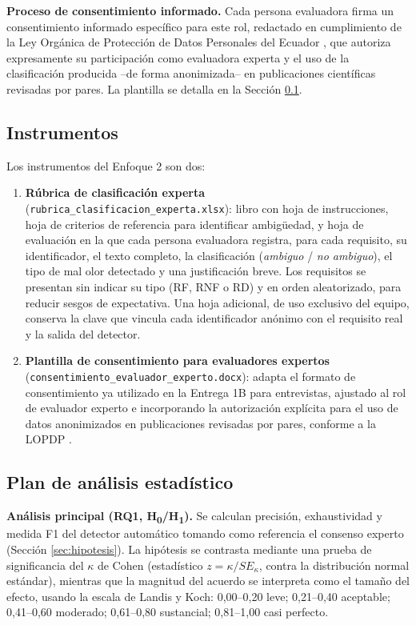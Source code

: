 \documentclass[journal,onecolumn]{IEEEtran}
\begin{document}
	\textbf{Proceso de consentimiento informado.} Cada persona evaluadora firma
	un consentimiento informado específico para este rol, redactado en
	cumplimiento de la Ley Orgánica de Protección de Datos Personales del
	Ecuador \cite{lopdp2021}, que autoriza expresamente su participación como
	evaluadora experta y el uso de la clasificación producida --de forma
	anonimizada-- en publicaciones científicas revisadas por pares. La
	plantilla se detalla en la Sección \ref{sec:instrumentos}.
	
	\subsection{Instrumentos}
	\label{sec:instrumentos}
	
	Los instrumentos del Enfoque 2 son dos:
	
	\begin{enumerate}[leftmargin=*]
		\item \textbf{Rúbrica de clasificación experta}
		(\texttt{rubrica\_clasificacion\_experta.xlsx}): libro con hoja de
		instrucciones, hoja de criterios de referencia para identificar
		ambigüedad, y hoja de evaluación en la que cada persona evaluadora
		registra, para cada requisito, su identificador, el texto completo,
		la clasificación (\emph{ambiguo} / \emph{no ambiguo}), el tipo de
		mal olor detectado y una justificación breve. Los requisitos se
		presentan sin indicar su tipo (RF, RNF o RD) y en orden aleatorizado,
		para reducir sesgos de expectativa. Una hoja adicional, de uso
		exclusivo del equipo, conserva la clave que vincula cada identificador
		anónimo con el requisito real y la salida del detector.
		\item \textbf{Plantilla de consentimiento para evaluadores expertos}
		(\texttt{consentimiento\_evaluador\_experto.docx}): adapta el formato
		de consentimiento ya utilizado en la Entrega 1B para entrevistas,
		ajustado al rol de evaluador experto e incorporando la autorización
		explícita para el uso de datos anonimizados en publicaciones
		revisadas por pares, conforme a la LOPDP \cite{lopdp2021}.
	\end{enumerate}
	
	\subsection{Plan de análisis estadístico}
	\label{sec:plan-analisis}
	
	\textbf{Análisis principal (RQ1, H\textsubscript{0}/H\textsubscript{1}).}
	Se calculan precisión, exhaustividad y medida F1 del detector automático
	tomando como referencia el consenso experto (Sección \ref{sec:hipotesis}).
	La hipótesis se contrasta mediante una prueba de significancia del $\kappa$
	de Cohen (estadístico $z = \kappa / SE_{\kappa}$, contra la distribución
	normal estándar), mientras que la magnitud del acuerdo se interpreta como
	el tamaño del efecto, usando la escala de Landis y Koch: 0,00--0,20 leve;
	0,21--0,40 aceptable; 0,41--0,60 moderado; 0,61--0,80 sustancial;
	0,81--1,00 casi perfecto.
	
\end{document}

